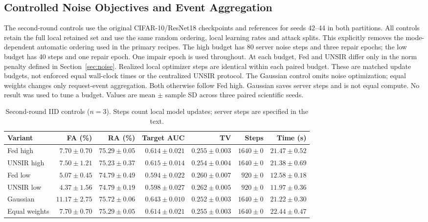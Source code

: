 \subsection{Controlled Noise Objectives and Event Aggregation}
\label{sec:round2-controls}
The second-round controls use the original CIFAR-10/ResNet18 checkpoints and
references for seeds 42--44 in both partitions. All controls retain the full
local retained set and use the same random ordering, local learning rates and
attack splits. This explicitly removes the mode-dependent automatic ordering
used in the primary recipes. The high budget has 80 server noise steps and
three repair epochs; the low budget has 40 steps and one repair epoch. One
impair epoch is used throughout. At each budget, Fed and UNSIR differ only in
the norm penalty defined in Section~\ref{sec:noise}. Realized local optimizer
steps are identical within each paired budget. These are matched update
budgets, not enforced equal wall-clock times or the centralized UNSIR protocol.
The Gaussian control omits noise optimization; equal weights changes only
request-event aggregation. Both otherwise follow Fed high. Gaussian saves
server steps and is not equal compute. No result was used to tune a budget.
Values are mean $\pm$ sample SD across three paired scientific seeds.
\begin{table}[H]\centering\scriptsize\setlength{\tabcolsep}{4pt}
\caption{Second-round IID controls ($n=3$). Steps count local model updates; server steps are specified in the text.}
\label{tab:round2-iid}\begin{tabular}{lrrrrrr}\toprule Variant & FA (\%) & RA (\%) & Target AUC & TV & Steps & Time (s)\\\midrule
Fed high & $7.70 \pm 0.70$ & $75.29 \pm 0.05$ & $0.614 \pm 0.021$ & $0.255 \pm 0.003$ & $1640 \pm 0$ & $21.47 \pm 0.52$\\
UNSIR high & $7.50 \pm 1.21$ & $75.23 \pm 0.37$ & $0.615 \pm 0.014$ & $0.254 \pm 0.004$ & $1640 \pm 0$ & $21.38 \pm 0.69$\\
Fed low & $5.07 \pm 0.45$ & $74.79 \pm 0.49$ & $0.594 \pm 0.022$ & $0.260 \pm 0.007$ & $920 \pm 0$ & $12.58 \pm 0.18$\\
UNSIR low & $4.37 \pm 1.56$ & $74.79 \pm 0.19$ & $0.598 \pm 0.027$ & $0.262 \pm 0.005$ & $920 \pm 0$ & $11.97 \pm 0.36$\\
Gaussian & $11.17 \pm 2.75$ & $75.72 \pm 0.06$ & $0.643 \pm 0.010$ & $0.252 \pm 0.003$ & $1640 \pm 0$ & $21.22 \pm 0.30$\\
Equal weights & $7.70 \pm 0.70$ & $75.29 \pm 0.05$ & $0.614 \pm 0.021$ & $0.255 \pm 0.003$ & $1640 \pm 0$ & $22.44 \pm 0.47$\\
\bottomrule\end{tabular}\end{table}
